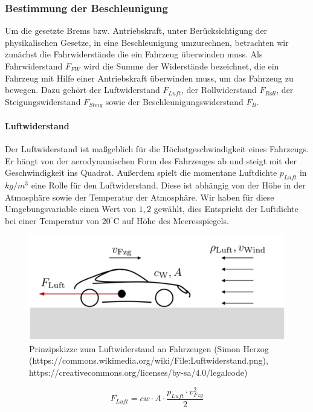 \documentclass[12pt,a4paper,bibliography=totocnumbered,listof=totocnumbered, abstracton]{scrartcl}
\theoremstyle{Umgebung}
\begin{document}
\subsubsection{Bestimmung der Beschleunigung}

Um die gesetzte Brems bzw. Antriebskraft, unter Berücksichtigung der physikalischen Gesetze, in eine Beschleunigung umzurechnen, betrachten wir zunächst die Fahrwiderstände die ein Fahrzeug überwinden muss. Als Fahrwiderstand $F_{FW}$ wird die Summe der Widerstände bezeichnet, die ein Fahrzeug mit Hilfe einer Antriebskraft überwinden muss, um das Fahrzeug zu bewegen. Dazu gehört der Luftwiderstand $F_{Luft}$, der Rollwiderstand $F_{Roll}$, der Steigungswiderstand $F_{Steig}$ sowie der Beschleunigungswiderstand $F_{B}$.

\paragraph{Luftwiderstand}

Der Luftwiderstand ist maßgeblich für die Höchstgeschwindigkeit eines Fahrzeugs. Er hängt von der aerodynamischen Form des Fahrzeuges ab und steigt mit der Geschwindigkeit ins Quadrat. Außerdem spielt die momentane Luftdichte $p_{Luft}$ in $kg/m^3$ eine Rolle für den Luftwiderstand. Diese ist abhängig von der Höhe in der Atmosphäre sowie der Temperatur der Atmosphäre.  Wir haben für diese Umgebungsvariable einen Wert von $1,2$ gewählt, dies Entspricht der Luftdichte bei einer Temperatur von $20^\circ\text{C}$ auf Höhe des Meeresspiegels.

\begin{figure}
	\centering
	\includegraphics[width=0.7\linewidth]{img/practical/Luftwiderstand}
	\caption{Prinzipskizze zum Luftwiderstand an Fahrzeugen (Simon Herzog (https://commons.wikimedia.org/wiki/File:Luftwiderstand.png), https://creativecommons.org/licenses/by-sa/4.0/legalcode)}
	\label{fig:luftwiderstand}
\end{figure}

\begin{equation}
F_{Luft} = cw \cdot A \cdot \frac{p_{Luft} \cdot v_{Fzg}^2}{2}
\end{equation}
\end{document}
